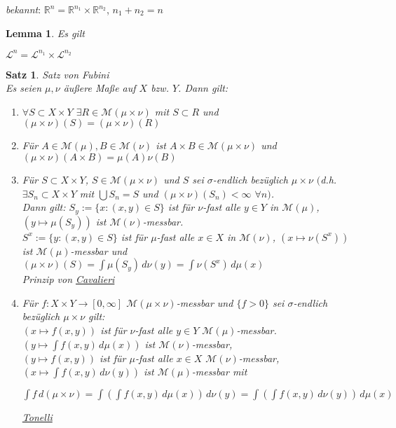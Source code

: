 \documentclass[11pt]{memoir}
\theoremstyle{changebreak}
\newtheorem{Lemma}{Lemma}[chapter]
\newtheorem{Satz}{Satz}[chapter]
\begin{document}
\emph{bekannt}:
$\mathbb R^n = \mathbb R^{n_1} \times \mathbb R^{n_2}$, $n_1 + n_2 = n$

\begin{Lemma}
Es gilt
\begin{center}
	$\mathscr L^n = \mathscr L^{n_1} \times \mathscr L^{n_2}$
\end{center}
\end{Lemma}


\begin{Satz}
\emph{Satz von Fubini} \\
Es seien $\mu, \nu$ äußere Maße auf $X$ bzw. $Y$. Dann gilt:
\begin{enumerate}
	\item $\forall S \subset X \times Y$ $\exists R \in \mathscr M(\mu \times \nu)$ mit $S \subset R$ und $(\mu \times \nu)(S) = (\mu \times \nu)(R)$

	\item Für $A \in \mathscr M(\mu), B \in \mathscr M(\nu)$ ist $A \times B \in \mathscr M(\mu \times \nu)$ und $(\mu \times \nu)(A \times B) = \mu(A)\nu(B)$

	\item Für $S \subset X \times Y$, $S \in \mathscr M(\mu \times \nu)$ und $S$ sei $\sigma$-endlich bezüglich $\mu \times \nu$ $($d.h. $\exists S_n \subset X \times Y$ mit $\bigcup S_n = S$ und $(\mu \times \nu)(S_n) < \infty$ $\forall n)$. \\
	Dann gilt: $S_y := \{x: (x, y) \in S\}$ ist für $\nu$-fast alle $y \in Y$ in $\mathscr M(\mu)$, $(y \mapsto \mu(S_y))$ ist $\mathscr M(\nu)$-messbar. \\
	$S^x := \{y : (x, y) \in S\}$ ist für $\mu$-fast alle $x \in X$ in $\mathscr M(\nu)$, $(x \mapsto \nu(S^x))$ ist $\mathscr M(\mu)$-messbar und $(\mu \times \nu)(S) = \int \mu(S_y)\, d\nu(y) = \int \nu(S^x) \, d\mu(x)$ \\
	\emph{Prinzip von \underline{Cavalieri}}

	\item Für $f: X \times Y \rightarrow [0, \infty]$ $\mathscr M(\mu \times \nu)$-messbar und $\{f > 0\}$ sei $\sigma$-endlich bezüglich $\mu \times \nu$ gilt: \\
	$(x \mapsto f(x, y))$ ist für $\nu$-fast alle $y \in Y$ $\mathscr M(\mu)$-messbar. \\
	$\left(y \mapsto \int f(x, y) \, d\mu(x)\right) $ ist $\mathscr M(\nu)$-messbar, \\
	$(y \mapsto f(x, y))$ ist für $\mu$-fast alle $x \in X$ $\mathscr M(\nu)$-messbar, \\
	$\left( x \mapsto \int f(x, y) \, d\nu(y)\right)$ ist $\mathscr M(\mu)$-messbar mit
	\begin{center}
		$\int f \, d(\mu \times \nu) = \int \left( \int f(x, y) \, d\mu(x) \right) \, d\nu(y) = \int \left( \int f(x, y) \, d\nu(y) \right) \, d\mu(x)$ \\
	\end{center}
	\emph{\underline{Tonelli}}


\end{enumerate}
\end{Satz}
\end{document}
